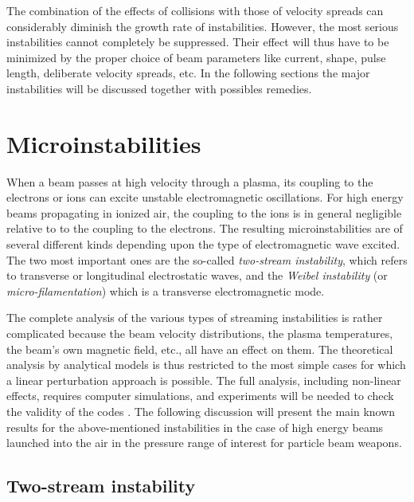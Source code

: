 \documentclass [12pt,a4paper,     ]{report} %
\begin{document}
	The combination of the effects of collisions with those of velocity spreads can considerably diminish the growth rate of instabilities.  However, the most serious instabilities cannot completely be suppressed.  Their effect will thus have to be minimized by the proper choice of beam parameters like current, shape, pulse length, deliberate velocity spreads, etc.  In the following sections the major instabilities will be discussed together with possibles remedies. 



\section{Microinstabilities}
\label{mic:0}


	When a beam passes at high velocity through a plasma, its coupling to the electrons or ions can excite unstable electromagnetic oscillations.  For high energy beams propagating in ionized air, the coupling to the ions is in general negligible relative to to the coupling to the electrons.  The resulting microinstabilities are of several different kinds depending upon the type of electromagnetic wave excited.  The two most important ones are the so-called \emph{two-stream instability}, which refers to transverse or longitudinal electrostatic waves, and the \emph{Weibel instability} (or \emph{micro-filamentation}) which is a transverse electromagnetic mode.


	The complete analysis of the various types of streaming instabilities is rather complicated because the beam velocity distributions, the plasma temperatures, the beam's own magnetic field, etc., all have an effect on them.  The theoretical analysis by analytical models is thus restricted to the most simple cases for which a linear perturbation approach is possible.  The full analysis, including non-linear effects, requires computer simulations, and experiments will be needed to check the validity of the codes \cite{MOIR-1981-,BARLE1981A}.   The following discussion will present the main known results for the above-mentioned instabilities in the case of high energy beams launched into the air in the pressure range of interest for particle beam weapons.

\subsection{Two-stream instability}
\end{document}
